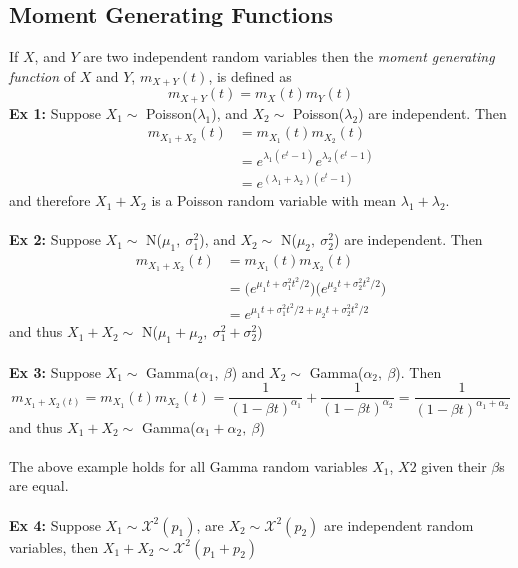 \documentclass{article}
\newcommand{\ti}[1]{\textit{#1}}
\newcommand{\tb}[1]{\textbf{#1}}
\newcommand{\la}{\lambda}
\newcommand{\al}{\alpha}
\newcommand{\sg}{\sigma}
\newcommand{\be}{\beta}
\newcommand{\exxi}{\textbf{Ex 1: }}
\newcommand{\exxii}{\textbf{Ex 2:  }}
\newcommand{\exxiii}{\textbf{Ex 3:  }}
\begin{document}
\subsection{Moment Generating Functions}
If $X$, and $Y$ are two independent random variables then the \ti{moment generating function} of $X$ and $Y$, $m_{X+Y}(t)$, is defined as
\[m_{X+Y}(t) = m_{X}(t)m_{Y}(t)\]
\exxi Suppose $X_{1} \sim$ Poisson($\la_{1}$), and $X_{2} \sim$ Poisson($\la_{2}$) are independent. Then
\begin{align*}
	m_{X_{1}+X_{2}}(t) &= m_{X_{1}}(t)m_{X_{2}}(t)\\
					&= e^{\la_{1}(e^{t}-1)}e^{\la_{2}(e^{t}-1)}\\
					&= e^{(\la_{1}+\la_{2})(e^{t}-1)}
\end{align*}
and therefore $X_{1} + X_{2}$ is a Poisson random variable with mean $\la_{1} + \la_{2}$.\\\\
\exxii Suppose $X_{1} \sim$ N($\mu_{1},\ \sg_{1}^{2}$), and $X_{2} \sim$ N($\mu_{2},\ \sg_{2}^{2}$) are independent. Then
\begin{align*}
	m_{X_{1}+X_{2}}(t) &= m_{X_{1}}(t)m_{X_{2}}(t)\\
					&= \big(e^{\mu_{1}t+\sg_{1}^{2}t^{2}/2}\big)\big(e^{\mu_{2}t+\sg_{2}^{2}t^{2}/2}\big)\\
					&= e^{\mu_{1}t+\sg_{1}^{2}t^{2}/2 + \mu_{2}t+\sg_{2}^{2}t^{2}/2}
\end{align*}
and thus $X_{1} + X_{2} \sim$ N($\mu_{1} + \mu_{2},\ \sg_{1}^{2} + \sg_{2}^{2}$)\\\\
\exxiii Suppose $X_{1} \sim$ Gamma($\al_{1},\ \be$) and $X_{2} \sim$ Gamma($\al_{2},\ \be$). Then
\[m_{X_{1} + X_{2}(t)} = m_{X_{1}}(t)m_{X_{2}}(t) = \frac{1}{(1-\be t)^{\al_{1}}} + \frac{1}{(1-\be t)^{\al_{2}}} = \frac{1}{(1-\be t)^{\al_{1} + \al_{2}}}\]
and thus $X_{1} + X_{2} \sim$ Gamma($\al_{1} + \al_{2},\ \be$)\\\\
The above example holds for all Gamma random variables $X_{1}$, $X{2}$ given their $\be$s are equal.\\\\
\tb{Ex 4:} Suppose $X_{1} \sim \mathcal{X}^{2}(p_{1})$, are $X_{2} \sim \mathcal{X}^{2}(p_{2})$ are independent random variables, then $X_{1} + X_{2} \sim \mathcal{X}^{2}(p_{1}+p_{2})$
\end{document}
